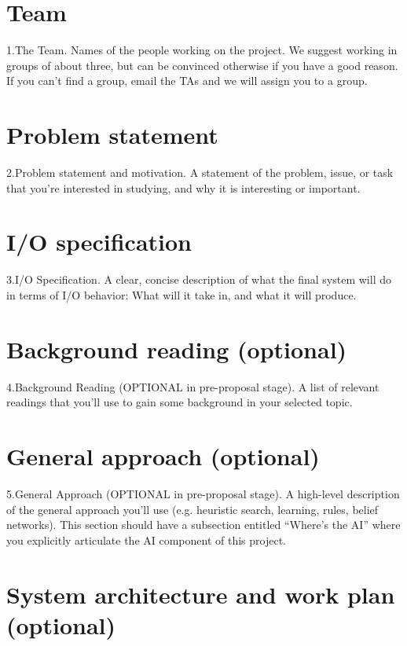 \section{Team}

1.The Team. Names of the people working on the project. We suggest
working in groups of about three, but can be convinced otherwise if
you have a good reason. If you can’t find a group, email the TAs and
we will assign you to a group.



\section{Problem statement}

2.Problem statement and motivation. A statement of the problem, issue,
or task that you’re interested in studying, and why it is interesting
or important.



\section{I/O specification}

3.I/O Specification. A clear, concise description of what the final
system will do in terms of I/O behavior: What will it take in, and
what it will produce.



\section{Background reading (optional)}

4.Background Reading (OPTIONAL in pre-proposal stage). A list of
relevant readings that you’ll use to gain some background in your
selected topic.



\section{General approach (optional)}

5.General Approach (OPTIONAL in pre-proposal stage). A high-level
description of the general approach you’ll use (e.g. heuristic search,
learning, rules, belief networks). This section should have a
subsection entitled “Where’s the AI” where you explicitly articulate
the AI component of this project.



\section{System architecture and work plan (optional)}

